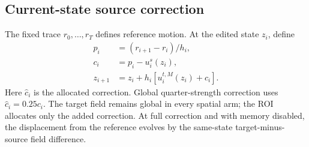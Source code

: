 \documentclass[conference]{IEEEtran}
\begin{document}
\subsection{Current-state source correction}
The fixed trace $r_0,\ldots,r_T$ defines reference motion. At the edited state $z_i$, define
\begin{equation}
\begin{aligned}
p_i&=(r_{i+1}-r_i)/h_i,\\
c_i&=p_i-u_i^s(z_i),\\
z_{i+1}&=z_i+h_i[u_i^{t,M}(z_i)+\widehat c_i].
\end{aligned}
\label{eq:spatial-update}
\end{equation}
Here $\widehat c_i$ is the allocated correction. Global quarter-strength correction uses $\widehat c_i=0.25c_i$. The target field remains global in every spatial arm; the ROI allocates only the added correction. At full correction and with memory disabled, the displacement from the reference evolves by the same-state target-minus-source field difference.
\end{document}

